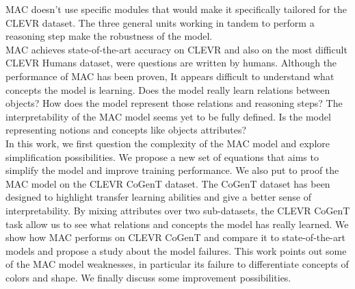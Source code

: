 MAC doesn’t use specific modules that would make it specifically tailored for the CLEVR dataset. The three general units working in tandem to perform a reasoning step make the robustness of the model.\\
MAC achieves state-of-the-art accuracy on CLEVR and also on the most difficult CLEVR Humans dataset, were questions are written by humans. 
Although the performance of MAC has been proven, It appears difficult to understand what concepts the model is learning. 
Does the model really learn relations between objects? 
How does the model represent those relations and reasoning steps? 
The interpretability of the MAC model seems yet to be fully defined.
Is the model representing notions and concepts like objects attributes?\\
In this work, we first question the complexity of the MAC model and explore simplification possibilities. We propose a new set of equations that aims to simplify the model and improve training performance. 
We also put to proof the MAC model on the CLEVR CoGenT dataset. The CoGenT dataset has been designed to highlight transfer learning abilities and give a better sense of interpretability. By mixing attributes over two sub-datasets, the CLEVR CoGenT task allow us to see what relations and concepts the model has really learned. We show how MAC performs on CLEVR CoGenT and compare it to state-of-the-art models and propose a study about the model failures. This work points out some of the MAC model weaknesses, in particular its failure to differentiate concepts of colors and shape. We finally discuss some improvement possibilities.
